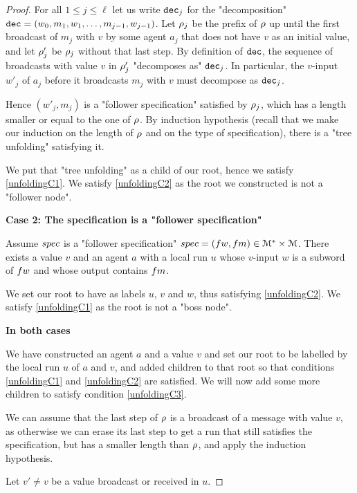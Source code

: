 \begin{proof}
	For all $1 \leq j \leq \ell$ let us write $\mathtt{dec}_j$ for the "decomposition" $\mathtt{dec} = (w_0, m_1, w_1, \ldots, m_{j-1}, w_{j-1})$. Let $\rho_j$ be the prefix of $\rho$ up until the first broadcast of $m_j$ with $v$ by some agent $a_j$ that does not have $v$ as an initial value, and let $\rho'_j$ be $\rho_j$ without that last step. By definition of $\mathtt{dec}$, the sequence of broadcasts with value $v$ in $\rho'_j$ "decomposes as" $\mathtt{dec}_j$.
	In particular, the $v$-input $w'_j$ of $a_j$ before it broadcasts $m_j$ with $v$ must decompose as $\mathtt{dec}_j$.
	
	Hence $(w'_j, m_j)$ is a "follower specification" satisfied by $\rho_j$, which has a length smaller or equal to the one of $\rho$. By induction hypothesis (recall that we make our induction on the length of $\rho$ and on the type of specification), there is a "tree unfolding" satisfying it.
	
	We put that "tree unfolding" as a child of our root, hence we satisfy \ref{unfoldingC1}. We satisfy \ref{unfoldingC2} as the root we constructed is not a "follower node".
	
	\textbf{Case 2: The specification is a "follower specification"} 
	
	Assume $\spec$ is a "follower specification" $\spec = (\followwordspec, \followmessagespec) \in \messages^* \times \messages$. 
	There exists a value $v$ and an agent $a$ with a local run $u$ whose $v$-input $w$ is a subword of $\followwordspec$ and whose output contains $\followmessagespec$. 
	
	We set our root to have as labels $u$, $v$ and $w$, thus satisfying \ref{unfoldingC2}. We satisfy \ref{unfoldingC1} as the root is not a "boss node".
	
	\textbf{In both cases}
	
	We have constructed an agent $a$ and a value $v$ and set our root to be labelled by the local run $u$ of $a$ and $v$, and added children to that root so that conditions \ref{unfoldingC1} and \ref{unfoldingC2} are satisfied. We will now add some more children to satisfy condition \ref{unfoldingC3}.
	
	We can assume that the last step of $\rho$ is a broadcast of a message with value $v$, as otherwise we can erase its last step to get a run that still satisfies the specification, but has a smaller length than $\rho$, and apply the induction hypothesis.
	
	Let $v' \neq v$ be a value broadcast or received in $u$. 
	

\end{proof}
